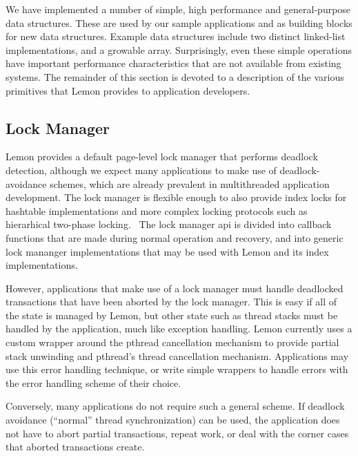 \documentclass[10pt,letterpaper,twocolumn,english]{article}
\newcommand{\yad}{Lemon\xspace}
\newcommand{\eab}[1]{\textcolor{red}{\bf EAB: #1}}
\begin{document}
We have implemented a number of simple, high performance
and general-purpose data structures.  These are used by our sample
applications and as building blocks for new data structures.  Example
data structures include two distinct linked-list implementations, and
a growable array.  Surprisingly, even these simple operations have
important performance characteristics that are not available from
existing systems. 
The remainder of this section is devoted to a description of the
various primitives that \yad provides to application developers.

\subsection{Lock Manager}
\label{lock-manager}

 \yad provides a default page-level lock manager that performs deadlock
detection, although we expect many applications to make use of
deadlock-avoidance schemes, which are already prevalent in
multithreaded application development.  The lock manager is flexible
enough to also provide index locks for hashtable implementations and 
more complex locking protocols such as hierarhical two-phase 
locking.~\cite{hierarcicalLocking,hierarchicalLockingOnAriesExample}  
The lock manager api is divided into callback functions that are made 
during normal operation and recovery, and into generic lock mananger 
implementations that may be used with \yad and its index implementations.



However, applications that
make use of a lock manager must handle deadlocked transactions
that have been aborted by the lock manager.  This is easy if all of
the state is managed by \yad, but other state such as thread stacks
must be handled by the application, much like exception handling.  
\yad currently uses a custom wrapper around the pthread cancellation 
mechanism to provide partial stack unwinding and pthread's thread
cancellation mechanism.  Applications may use this error handling 
technique, or write simple wrappers to handle errors with the 
error handling scheme of their choice.

Conversely, many applications do not require such a general scheme.
If deadlock avoidance (``normal'' thread synchronization) can be used,
the application does not have to abort partial transactions, repeat
work, or deal with the corner cases that aborted transactions create.
\end{document}
